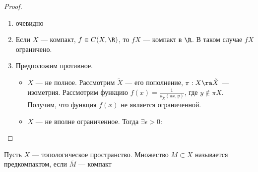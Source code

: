\begin{proof}
\begin{enumerate}
\begin{itemize}
        \end{itemize}
        \item[\((3) \Lra (4)\)] очевидно
        \item[\((2) \Ra (5)\)] Если \(X\) --- компакт, \(f \in C(X, \R)\), то \(fX\) --- компакт в \(\R\). В таком случае \(fX\) ограничено.
        \item[\((5) \Ra (2)\)] Предположим противное.
        \begin{itemize}
            \item \(X\) --- не полное. Рассмотрим \(\tilde X\) --- его пополнение, \(\pi: X \ra \tilde X\) --- изометрия. Рассмотрим функцию \(f(x) = \frac{1}{\rho_{\tilde X}(\pi x, y)}\), где \(y \notin \pi X\). Получим, что функция \(f(x)\) не является ограниченной.
            \item \(X\) --- не вполне ограниченное. Тогда \(\exists \epsilon > 0\): 
        \end{itemize}
    \end{enumerate}
\end{proof}

\begin{definition}
    Пусть \(X\) --- топологическое пространство. Множество \(M \subset X\) называется предкомпактом, если \(\overline{M}\) --- компакт
\end{definition}

